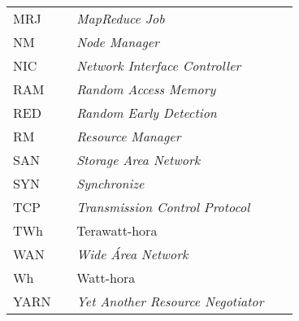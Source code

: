 \begin{listaacron}
\begin{longtable}[l]{p{0.2\linewidth}p{0.7\linewidth}}
MRJ & \emph{MapReduce Job}\\
NM & \emph{Node Manager}\\
NIC & \emph{Network Interface Controller}\\
RAM & \emph{Random Access Memory}\\
RED & \emph{Random Early Detection}\\
RM & \emph{Resource Manager}\\
SAN & \emph{Storage Area Network}\\
SYN & \emph{Synchronize}\\
TCP & \emph{Transmission Control Protocol}\\
TWh & Terawatt-hora\\
WAN & \emph{Wide Área Network}\\
Wh & Watt-hora\\
YARN & \emph{Yet Another Resource Negotiator}\\
\end{longtable}

\end{listaacron}

